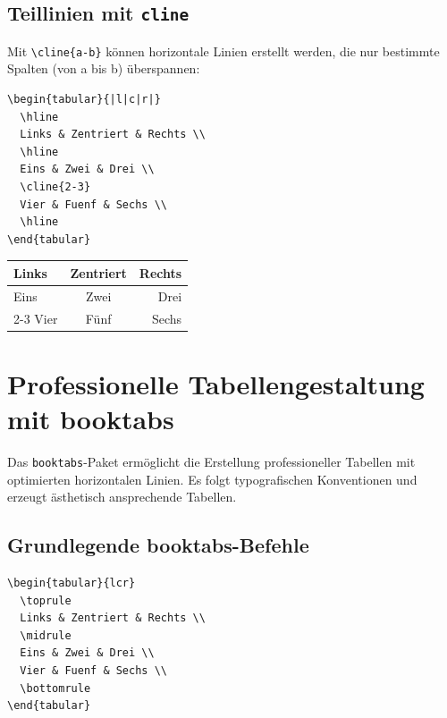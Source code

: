 \documentclass[12pt,a4paper]{article}
\begin{document}
\subsection{Teillinien mit \texttt{cline}}

Mit \texttt{\textbackslash cline\{a-b\}} können horizontale Linien erstellt werden, die nur bestimmte Spalten (von a bis b) überspannen:

\begin{lstlisting}[style=latex]
\begin{tabular}{|l|c|r|}
  \hline
  Links & Zentriert & Rechts \\
  \hline
  Eins & Zwei & Drei \\
  \cline{2-3}
  Vier & Fuenf & Sechs \\
  \hline
\end{tabular}
\end{lstlisting}

\begin{ausgabe}
\begin{center}
\begin{tabular}{|l|c|r|}
  \hline
  Links & Zentriert & Rechts \\
  \hline
  Eins & Zwei & Drei \\
  \cline{2-3}
  Vier & Fünf & Sechs \\
  \hline
\end{tabular}
\end{center}
\end{ausgabe}

\section{Professionelle Tabellengestaltung mit booktabs}

Das \texttt{booktabs}-Paket ermöglicht die Erstellung professioneller Tabellen mit optimierten horizontalen Linien. Es folgt typografischen Konventionen und erzeugt ästhetisch ansprechende Tabellen.

\subsection{Grundlegende booktabs-Befehle}

\begin{lstlisting}[style=latex]
\begin{tabular}{lcr}
  \toprule
  Links & Zentriert & Rechts \\
  \midrule
  Eins & Zwei & Drei \\
  Vier & Fuenf & Sechs \\
  \bottomrule
\end{tabular}
\end{lstlisting}
\end{document}
